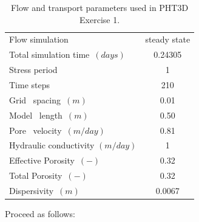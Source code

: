 \begin{table}[b]
\caption{Flow and transport parameters used in PHT3D Exercise 1.}
\begin{center}
\begin{tabular}{lc}
\toprule
 Flow simulation                      &  steady state   \\
 Total simulation time\  $(days)$     &  0.24305        \\
 Stress period                        &  1              \\
 Time steps                           &  210            \\
 Grid \ spacing\ $(m)       $         &  0.01           \\
 Model \  length\ $(m)      $         &  0.50           \\
 Pore  \ velocity\ $(m/day) $         &  0.81           \\
 Hydraulic conductivity $(m/day) $    &   1             \\
 Effective Porosity\ $(-)$            &  0.32           \\
 Total Porosity\  $(-)$               &  0.32           \\
 Dispersivity\ $(m)         $         &  0.0067         \\ 
 \bottomrule
\end{tabular}
\label{ex2_flow}
\end{center}
\end{table}

Proceed as follows:


